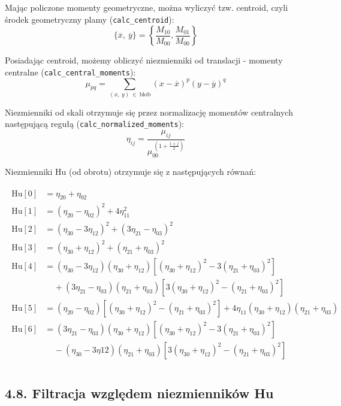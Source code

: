 \documentclass[11pt,a4paper,twoside]{report}
\begin{document}
			Mając policzone momenty geometryczne, można wyliczyć tzw. centroid, czyli środek geometryczny plamy (\texttt{calc\_centroid}):
			\[
				\{\overline{x},~\overline{y}\} = \left\{ \frac{M_{10}}{M_{00}}, \frac{M_{01}}{M_{00}} \right\}
			\]

			Posiadając centroid, możemy obliczyć niezmienniki od translacji - momenty centralne (\texttt{calc\_central\_moments}):
			\[
				\mu_{pq} = \sum_{(x,~y)~\in~\text{blob}} (x - \overline{x})^p (y - \overline{y})^q
			\]

			Niezmienniki od skali otrzymuje się przez normalizację momentów centralnych następującą regułą (\texttt{calc\_normalized\_moments}):
			\[
				\eta_{ij} = \frac{\mu_{ij}}{\mu_{00}^{~\left(1 + \frac{1+j}{2}\right)}}
			\]

			Niezmienniki Hu (od obrotu) otrzymuje się z następujących równań:

			\begin{align}
			\begin{split}
			   \text{Hu}[0] &= \eta_{20} + \eta_{02} \\
			   \text{Hu}[1] &= (\eta_{20} - \eta_{02})^2  + 4\eta_{11}^2 \\
			   \text{Hu}[2] &= (\eta_{30} - 3\eta_{12})^2 + (3\eta_{21} - \eta_{03})^2 \\
			   \text{Hu}[3] &= (\eta_{30} + \eta_{12})^2  + (\eta_{21} + \eta_{03})^2 \\
			   \text{Hu}[4] &= (\eta_{30} - 3\eta_{12}) (\eta_{30} + \eta_{12})[ (\eta_{30} + \eta_{12})^2 - 3 (\eta_{21} + \eta_{03})^2] \\			&~~~~~+ (3 \eta_{21} - \eta_{03}) (\eta_{21} + \eta_{03})[ 3(\eta_{30} + \eta_{12})^2 -  (\eta_{21} + \eta_{03})^2] \\
			   \text{Hu}[5] &=  (\eta_{20} - \eta_{02})[(\eta_{30} + \eta_{12})^2 - (\eta_{21} + \eta_{03})^2] + 4\eta_{11}(\eta_{30} + \eta_{12})(\eta_{21} + \eta_{03}) \\
			   \text{Hu}[6] &= (3 \eta_{21} - \eta_{03})(\eta_{30} + \eta_{12})[(\eta_{30} + \eta_{12})^2 - 3(\eta_{21} + \eta_{03})^2] \\
			   	   &~~~~~- (\eta_{30} - 3\eta {12})(\eta_{21} + \eta_{03})[3(\eta_{30} + \eta_{12})^2 - (\eta_{21} + \eta_{03})^2] \\
   			\end{split}
			\end{align}

	\subsection*{4.8. Filtracja względem niezmienników Hu}
\end{document}
